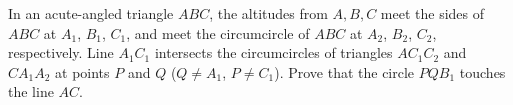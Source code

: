 In an acute-angled triangle $ABC$, the altitudes from $A,B,C$ meet the sides of $ABC$ at $A_1$, $B_1$, $C_1$, and meet the circumcircle of $ABC$ at $A_2$, $B_2$, $C_2$, respectively. Line  $A_1 C_1$ intersects the circumcircles of triangles $AC_1 C_2$ and $CA_1 A_2$ at points $P$ and $Q$ ($Q\neq A_1$, $P\neq C_1$). Prove that the circle $PQB_1$ touches the line $AC$.